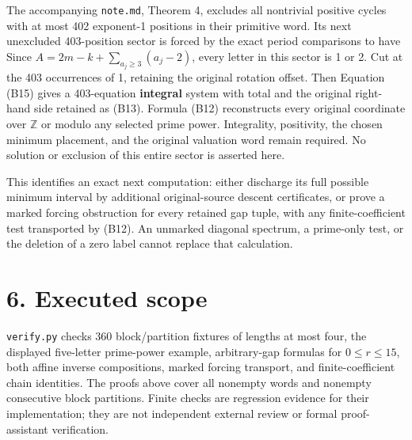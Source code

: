 The accompanying \nolinkurl{note.md}, Theorem 4, excludes all nontrivial
positive cycles with at most 402 exponent-1 positions in their primitive
word. Its next unexcluded 403-position sector is forced by the exact
period comparisons to have
 Since \(A=2m-k+\sum_{a_j\ge3}(a_j-2)\),
every letter in this sector is 1 or 2. Cut at the 403 occurrences of 1,
retaining the original rotation offset. Then
 Equation (B15)
gives a 403-equation \textbf{integral} system with total
 and the original right-hand side
retained as (B13). Formula (B12) reconstructs every original coordinate
over \(\mathbb Z\) or modulo any selected prime power. Integrality,
positivity, the chosen minimum placement, and the original valuation
word remain required. No solution or exclusion of this entire sector is
asserted here.

This identifies an exact next computation: either discharge its full
possible minimum interval by additional original-source descent
certificates, or prove a marked forcing obstruction for every retained
gap tuple, with any finite-coefficient test transported by (B12). An
unmarked diagonal spectrum, a prime-only test, or the deletion of a zero
label cannot replace that calculation.

\section{6. Executed scope}

\nolinkurl{verify.py} checks 360 block/partition fixtures of lengths at
most four, the displayed five-letter prime-power example, arbitrary-gap
formulas for \(0\le r\le15\), both affine inverse compositions, marked
forcing transport, and finite-coefficient chain identities. The proofs
above cover all nonempty words and nonempty consecutive block
partitions. Finite checks are regression evidence for their
implementation; they are not independent external review or formal
proof-assistant verification.
